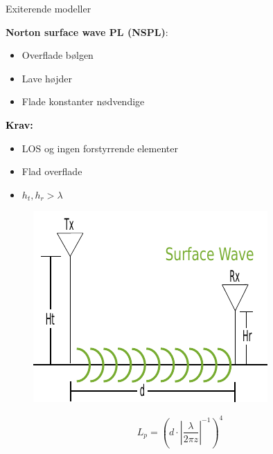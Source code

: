 \begin{frame}{Exiterende modeller}
\begin{minipage}{.45\textwidth}
\raggedright\textcolor{thomasgreen}{\textbf{Norton surface wave PL (NSPL)}:}
\begin{itemize}
\item Overflade bølgen
\item Lave højder
\item Flade konstanter nødvendige
\end{itemize}

\vspace{1em}
\textcolor{black}{\textbf{Krav:}}
\begin{itemize}
\item LOS og ingen forstyrrende elementer
\item Flad overflade
\item $h_t,h_r > \lambda$
\end{itemize}

\end{minipage}%
\begin{minipage}{0.5\textwidth}
\begin{figure}[!htbp]
 \centering
  \includegraphics[width = \columnwidth]{figures/surf_illu.pdf}
  \end{figure}
\end{minipage}

\vspace{1em}
\begin{equation}
L_p=\left({d} \cdot \left|\frac{\lambda}{2\pi z}\right|^{-1}\right)^4
\label{surface_wave}
\end{equation}
\end{frame}





